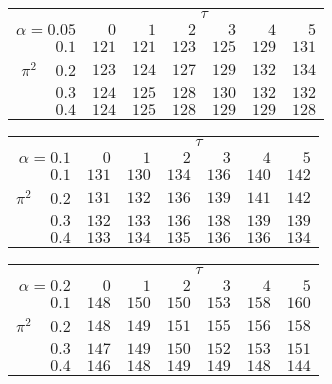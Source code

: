 \begin{tabular}{r|rrrrrr}
\hline\hline
 &\multicolumn{6}{c}{$\tau$} \\ 
 $\alpha = 0.05$ & $0$ & $1$ & $2$ & $3$ & $4$ & $5$ \\ 
 \hline$0.1$ & $121$ & $121$ & $123$ & $125$ & $129$ & $131$\\ 
$\pi^2\;\;\;$ $0.2$ & $123$ & $124$ & $127$ & $129$ & $132$ & $134$\\ 
$0.3$ & $124$ & $125$ & $128$ & $130$ & $132$ & $132$\\ 
$0.4$ & $124$ & $125$ & $128$ & $129$ & $129$ & $128$\\ 
 \hline 
 \end{tabular}
 
 \vspace{2em} 
 
\begin{tabular}{r|rrrrrr}
\hline\hline
 &\multicolumn{6}{c}{$\tau$} \\ 
 $\alpha = 0.1$ & $0$ & $1$ & $2$ & $3$ & $4$ & $5$ \\ 
 \hline$0.1$ & $131$ & $130$ & $134$ & $136$ & $140$ & $142$\\ 
$\pi^2\;\;\;$ $0.2$ & $131$ & $132$ & $136$ & $139$ & $141$ & $142$\\ 
$0.3$ & $132$ & $133$ & $136$ & $138$ & $139$ & $139$\\ 
$0.4$ & $133$ & $134$ & $135$ & $136$ & $136$ & $134$\\ 
 \hline 
 \end{tabular}
 
 \vspace{2em} 
 
\begin{tabular}{r|rrrrrr}
\hline\hline
 &\multicolumn{6}{c}{$\tau$} \\ 
 $\alpha = 0.2$ & $0$ & $1$ & $2$ & $3$ & $4$ & $5$ \\ 
 \hline$0.1$ & $148$ & $150$ & $150$ & $153$ & $158$ & $160$\\ 
$\pi^2\;\;\;$ $0.2$ & $148$ & $149$ & $151$ & $155$ & $156$ & $158$\\ 
$0.3$ & $147$ & $149$ & $150$ & $152$ & $153$ & $151$\\ 
$0.4$ & $146$ & $148$ & $149$ & $149$ & $148$ & $144$\\ 
 \hline 
 \end{tabular}